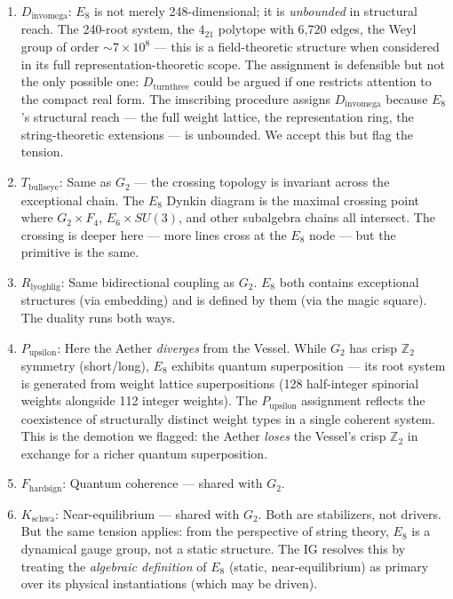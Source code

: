 \documentclass[12pt,a4paper]{article}
\begin{document}
\begin{enumerate}
    \item \textbf{$D_{\text{invomega}}$}: $E_8$ is not merely 248-dimensional; it is \emph{unbounded} in structural reach. The 240-root system, the $4_{21}$ polytope with 6,720 edges, the Weyl group of order $\sim 7 \times 10^8$ --- this is a field-theoretic structure when considered in its full representation-theoretic scope. The assignment is defensible but not the only possible one: $D_{\text{turnthree}}$ could be argued if one restricts attention to the compact real form. The imscribing procedure assigns $D_{\text{invomega}}$ because $E_8$'s structural reach --- the full weight lattice, the representation ring, the string-theoretic extensions --- is unbounded. We accept this but flag the tension.
    \item \textbf{$T_{\text{bullseye}}$}: Same as $G_2$ --- the crossing topology is invariant across the exceptional chain. The $E_8$ Dynkin diagram is the maximal crossing point where $G_2 \times F_4$, $E_6 \times SU(3)$, and other subalgebra chains all intersect. The crossing is deeper here --- more lines cross at the $E_8$ node --- but the primitive is the same.
    \item \textbf{$R_{\text{lyoghlig}}$}: Same bidirectional coupling as $G_2$. $E_8$ both contains exceptional structures (via embedding) and is defined by them (via the magic square). The duality runs both ways.
    \item \textbf{$P_{\text{upsilon}}$}: Here the Aether \emph{diverges} from the Vessel. While $G_2$ has crisp $\mathbb{Z}_2$ symmetry (short/long), $E_8$ exhibits quantum superposition --- its root system is generated from weight lattice superpositions (128 half-integer spinorial weights alongside 112 integer weights). The $P_{\text{upsilon}}$ assignment reflects the coexistence of structurally distinct weight types in a single coherent system. This is the demotion we flagged: the Aether \emph{loses} the Vessel's crisp $\mathbb{Z}_2$ in exchange for a richer quantum superposition.
    \item \textbf{$F_{\text{hardsign}}$}: Quantum coherence --- shared with $G_2$.
    \item \textbf{$K_{\text{schwa}}$}: Near-equilibrium --- shared with $G_2$. Both are stabilizers, not drivers. But the same tension applies: from the perspective of string theory, $E_8$ is a dynamical gauge group, not a static structure. The IG resolves this by treating the \emph{algebraic definition} of $E_8$ (static, near-equilibrium) as primary over its physical instantiations (which may be driven).

\end{enumerate}
\end{document}
